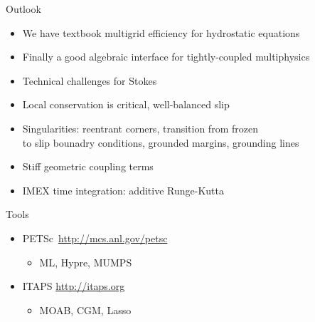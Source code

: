 \documentclass{beamer}
\begin{document}
\begin{frame}{Outlook}
  \begin{block}{}
    \begin{itemize}
    \item We have textbook multigrid efficiency for hydrostatic equations
    \item Finally a good algebraic interface for tightly-coupled multiphysics
    \item Technical challenges for Stokes
    \item Local conservation is critical, well-balanced slip
    \item Singularities: reentrant corners, transition from frozen \\ \quad 
      to slip bounadry conditions, grounded margins, grounding lines
    \item Stiff geometric coupling terms
    \item IMEX time integration: additive Runge-Kutta
    \end{itemize}    
  \end{block}
  \begin{block}{Tools}
    \begin{itemize}
    \item PETSc\ \url{http://mcs.anl.gov/petsc}
      \begin{itemize}\item ML, Hypre, MUMPS
      \end{itemize}
    \item ITAPS \url{http://itaps.org}
      \begin{itemize}\item MOAB, CGM, Lasso
      \end{itemize}
    \end{itemize}
  \end{block}
\end{frame}
\end{document}
